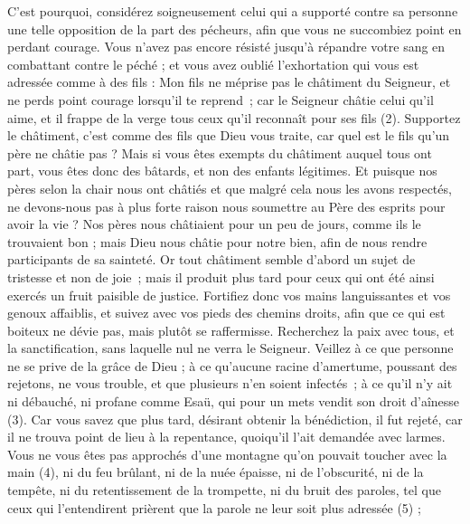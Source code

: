 \begin{multicols}{2}
C'est pourquoi, considérez soigneusement celui qui a supporté contre sa personne une telle opposition de la part des pécheurs, afin que vous ne succombiez point en perdant courage.
Vous n'avez pas encore résisté jusqu'à répandre votre sang en combattant contre le péché ;
et vous avez oublié l'exhortation qui vous est adressée comme à des fils : Mon fils ne méprise pas le châtiment du Seigneur, et ne perds point courage lorsqu’il te reprend ;
car le Seigneur châtie celui qu'il aime, et il frappe de la verge tous ceux qu’il reconnaît pour ses fils (2).
Supportez le châtiment, c’est comme des fils que Dieu vous traite, car quel est le fils qu’un père ne châtie pas ?
Mais si vous êtes exempts du châtiment auquel tous ont part, vous êtes donc des bâtards, et non des enfants légitimes.
Et puisque nos pères selon la chair nous ont châtiés et que malgré cela nous les avons respectés, ne devons-nous pas à plus forte raison nous soumettre au Père des esprits pour avoir la vie ?
Nos pères nous châtiaient pour un peu de jours, comme ils le trouvaient bon ; mais Dieu nous châtie pour notre bien, afin de nous rendre participants de sa sainteté.
Or tout châtiment semble d’abord un sujet de tristesse et non de joie ; mais il produit plus tard pour ceux qui ont été ainsi exercés un fruit paisible de justice.
Fortifiez donc vos mains languissantes et vos genoux affaiblis,
et suivez avec vos pieds des chemins droits, afin que ce qui est boiteux ne dévie pas, mais plutôt se raffermisse.
Recherchez la paix avec tous, et la sanctification, sans laquelle nul ne verra le Seigneur.
Veillez à ce que personne ne se prive de la grâce de Dieu ; à ce qu’aucune racine d'amertume, poussant des rejetons, ne vous trouble, et que plusieurs n’en soient infectés ;
à ce qu’il n’y ait ni débauché, ni profane comme Esaü, qui pour un mets vendit son droit d’aînesse (3).
Car vous savez que plus tard, désirant obtenir la bénédiction, il fut rejeté, car il ne trouva point de lieu à la repentance, quoiqu'il l’ait demandée avec larmes.
Vous ne vous êtes pas approchés d’une montagne qu’on pouvait toucher avec la main (4), ni du feu brûlant, ni de la nuée épaisse, ni de l'obscurité, ni de la tempête,
ni du retentissement de la trompette, ni du bruit des paroles, tel que ceux qui l'entendirent prièrent que la parole ne leur soit plus adressée (5) ;

\end{multicols}
